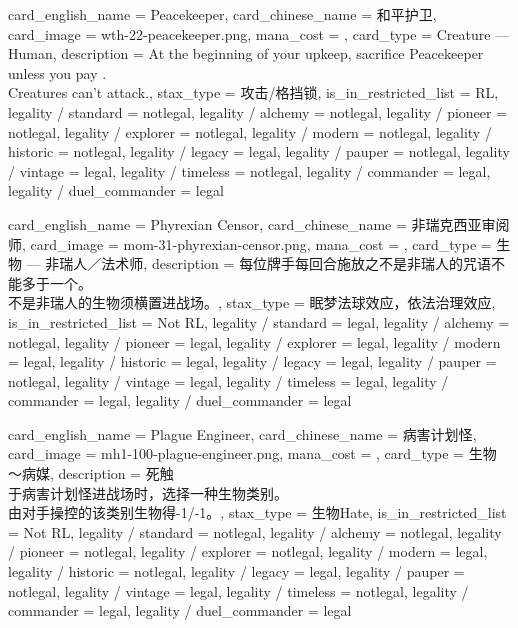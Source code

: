 \documentclass[lang = cn, color = black, 10pt]{AllThatStax}
\begin{document}
\card
{
	card_english_name = {Peacekeeper},
	card_chinese_name = {和平护卫},
	card_image = wth-22-peacekeeper.png,
	mana_cost = ,
	card_type = Creature — Human,
	description = {At the beginning of your upkeep, sacrifice Peacekeeper unless you pay .\\
		Creatures can't attack.},
	stax_type = 攻击/格挡锁,
	is_in_restricted_list = RL,
	legality / standard = notlegal,
	legality / alchemy = notlegal,
	legality / pioneer = notlegal,
	legality / explorer = notlegal,
	legality / modern = notlegal,
	legality / historic = notlegal,
	legality / legacy = legal,
	legality / pauper = notlegal,
	legality / vintage = legal,
	legality / timeless = notlegal,
	legality / commander = legal,
	legality / duel_commander = legal
}

\card
{
	card_english_name = {Phyrexian Censor},
	card_chinese_name = {非瑞克西亚审阅师},
	card_image = mom-31-phyrexian-censor.png,
	mana_cost = ,
	card_type = 生物 — 非瑞人／法术师,
	description = {每位牌手每回合施放之不是非瑞人的咒语不能多于一个。\\
		不是非瑞人的生物须横置进战场。},
	stax_type = 眠梦法球效应，依法治理效应,
	is_in_restricted_list = Not RL,
	legality / standard = legal,
	legality / alchemy = notlegal,
	legality / pioneer = legal,
	legality / explorer = legal,
	legality / modern = legal,
	legality / historic = legal,
	legality / legacy = legal,
	legality / pauper = notlegal,
	legality / vintage = legal,
	legality / timeless = legal,
	legality / commander = legal,
	legality / duel_commander = legal
}

\card
{
	card_english_name = {Plague Engineer},
	card_chinese_name = {病害计划怪},
	card_image = mh1-100-plague-engineer.png,
	mana_cost = ,
	card_type = 生物 ～病媒,
	description = {死触\\
		于病害计划怪进战场时，选择一种生物类别。\\
		由对手操控的该类别生物得-1/-1。},
	stax_type = 生物Hate,
	is_in_restricted_list = Not RL,
	legality / standard = notlegal,
	legality / alchemy = notlegal,
	legality / pioneer = notlegal,
	legality / explorer = notlegal,
	legality / modern = legal,
	legality / historic = notlegal,
	legality / legacy = legal,
	legality / pauper = notlegal,
	legality / vintage = legal,
	legality / timeless = notlegal,
	legality / commander = legal,
	legality / duel_commander = legal
}
\end{document}
